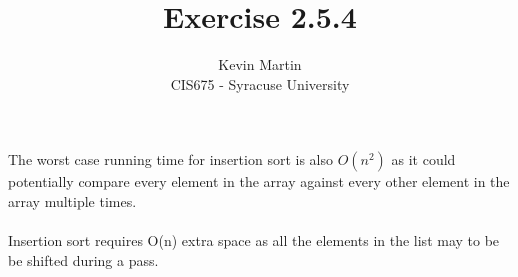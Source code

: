 \documentclass{article}
\author{Kevin Martin\\ CIS675 - Syracuse University}
\title{Exercise 2.5.4}
\begin{document}
\maketitle
The worst case running time for insertion sort is also \(O(n^2)\) as it could potentially compare every element in the array 
against every other element in the array multiple times. \\\\
Insertion sort requires O(n) extra space as all the elements in the list may to be be shifted during a pass.
\end{document}
